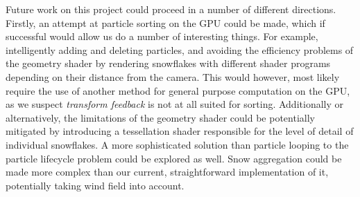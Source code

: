 \documentclass[conference]{acmsiggraph}
\begin{document}
Future work on this project could proceed in a number of different directions. Firstly, an attempt at particle sorting on the GPU could be made, which if successful would allow us do a number of interesting things. For example, intelligently adding and deleting particles, and avoiding the efficiency problems of the geometry shader by rendering snowflakes with different shader programs depending on their distance from the camera. This would however, most likely require the use of another method for general purpose computation on the GPU, as we suspect \textit{transform feedback} is not at all suited for sorting. Additionally or alternatively, the limitations of the geometry shader could be potentially mitigated by introducing a tessellation shader responsible for the level of detail of individual snowflakes. A more sophisticated solution than particle looping to the particle lifecycle problem could be explored as well. Snow aggregation could be made more complex than our current, straightforward implementation of it, potentially taking wind field into account.


\nocite{*}

\end{document}
